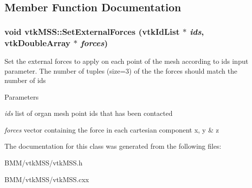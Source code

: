 \subsection{Member Function Documentation}
\hypertarget{classvtkMSS_a56525f271d9f074c26a64e11b1516a76}{
\subsubsection[{SetExternalForces}]{\setlength{\rightskip}{0pt plus 5cm}void vtkMSS::SetExternalForces (vtkIdList $\ast$ {\em ids}, \/  vtkDoubleArray $\ast$ {\em forces})}}
\label{classvtkMSS_a56525f271d9f074c26a64e11b1516a76}


Set the external forces to apply on each point of the mesh according to ids input parameter. The number of tuples (size=3) of the the forces should match the number of ids 
\begin{DoxyParams}{Parameters}
\item[{\em ids}]list of organ mesh point ids that has been contacted \item[{\em forces}]vector containing the force in each cartesian component x, y \& z \end{DoxyParams}


The documentation for this class was generated from the following files:\begin{DoxyCompactItemize}
\item 
BMM/vtkMSS/vtkMSS.h\item 
BMM/vtkMSS/vtkMSS.cxx\end{DoxyCompactItemize}
